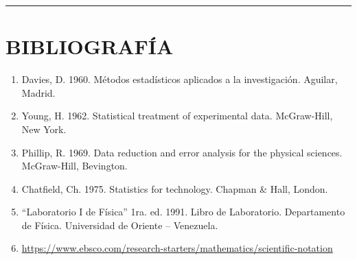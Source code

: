 \documentclass[12pt,a4paper]{article}
\begin{document}
\vspace{0.5cm}
\hrule
\vspace{0.5cm}

\section{BIBLIOGRAFÍA}
\begin{enumerate}
    \item Davies, D. 1960. Métodos estadísticos aplicados a la investigación. Aguilar, Madrid.
    \item Young, H. 1962. Statistical treatment of experimental data. McGraw-Hill, New York.
    \item Phillip, R. 1969. Data reduction and error analysis for the physical sciences. McGraw-Hill, Bevington.
    \item Chatfield, Ch. 1975. Statistics for technology. Chapman \& Hall, London.
    \item ``Laboratorio I de Física'' 1ra. ed. 1991. Libro de Laboratorio. Departamento de Física. Universidad de Oriente – Venezuela.
    \item \url{https://www.ebsco.com/research-starters/mathematics/scientific-notation}
\end{enumerate}
\end{document}
